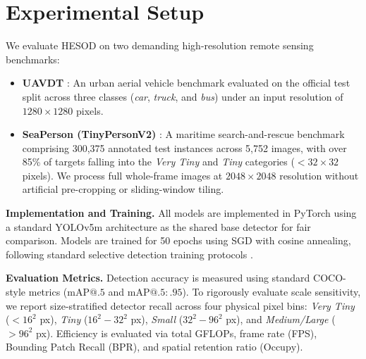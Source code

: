 \section{Experimental Setup}
\label{sec:setup}

We evaluate HESOD on two demanding high-resolution remote sensing benchmarks:
\begin{itemize}
    \item \textbf{UAVDT} \cite{UAVDT}: An urban aerial vehicle benchmark evaluated on the official test split across three classes (\emph{car}, \emph{truck}, and \emph{bus}) under an input resolution of $1280 \times 1280$ pixels.
    \item \textbf{SeaPerson (TinyPersonV2)} \cite{TinyPerson,SeaDronesSee}: A maritime search-and-rescue benchmark comprising 300,375 annotated test instances across 5,752 images, with over 85\% of targets falling into the \emph{Very Tiny} and \emph{Tiny} categories ($<32\times 32$ pixels). We process full whole-frame images at $2048 \times 2048$ resolution without artificial pre-cropping or sliding-window tiling.
\end{itemize}

\textbf{Implementation and Training.} All models are implemented in PyTorch using a standard YOLOv5m architecture as the shared base detector for fair comparison. Models are trained for 50 epochs using SGD with cosine annealing, following standard selective detection training protocols \cite{ESOD}.

\textbf{Evaluation Metrics.} Detection accuracy is measured using standard COCO-style metrics ($\mathrm{mAP@.5}$ and $\mathrm{mAP@.5:.95}$). To rigorously evaluate scale sensitivity, we report size-stratified detector recall across four physical pixel bins: \emph{Very Tiny} ($<16^2$ px), \emph{Tiny} ($16^2-32^2$ px), \emph{Small} ($32^2-96^2$ px), and \emph{Medium/Large} ($>96^2$ px). Efficiency is evaluated via total GFLOPs, frame rate (FPS), Bounding Patch Recall (BPR), and spatial retention ratio ($\mathrm{Occupy}$).
